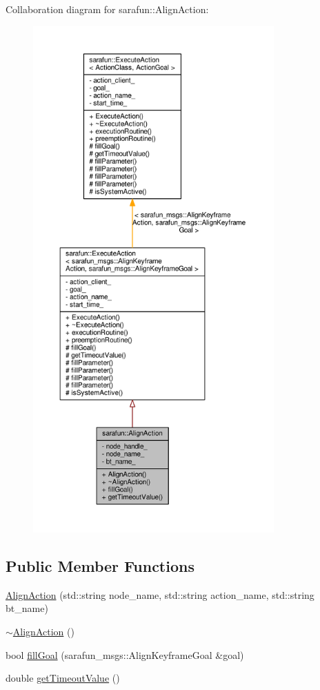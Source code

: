 Collaboration diagram for sarafun\-:\-:Align\-Action\-:\nopagebreak
\begin{figure}[H]
\begin{center}
\leavevmode
\includegraphics[height=550pt]{d2/d13/classsarafun_1_1AlignAction__coll__graph}
\end{center}
\end{figure}
\subsection*{Public Member Functions}
\begin{DoxyCompactItemize}
\item 
\hyperlink{classsarafun_1_1AlignAction_a013ed290585167a2693728565a764205_a013ed290585167a2693728565a764205}{Align\-Action} (std\-::string node\-\_\-name, std\-::string action\-\_\-name, std\-::string bt\-\_\-name)
\item 
\hyperlink{classsarafun_1_1AlignAction_a0fdb2f1de94801608024fb7dddd84f57_a0fdb2f1de94801608024fb7dddd84f57}{$\sim$\-Align\-Action} ()
\item 
bool \hyperlink{classsarafun_1_1AlignAction_ab92a62085ebd60438638b7b6c56da786_ab92a62085ebd60438638b7b6c56da786}{fill\-Goal} (sarafun\-\_\-msgs\-::\-Align\-Keyframe\-Goal \&goal)
\item 
double \hyperlink{classsarafun_1_1AlignAction_a9b9741ec3203bdc1b2e7b7cecc96e6ed_a9b9741ec3203bdc1b2e7b7cecc96e6ed}{get\-Timeout\-Value} ()
\end{DoxyCompactItemize}
